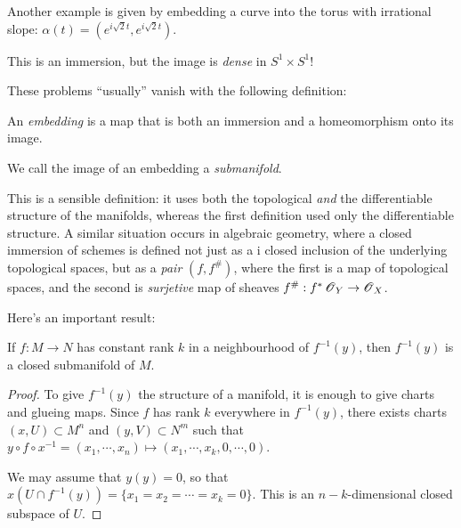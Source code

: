 \documentclass[11pt, english]{article}
\begin{document}
\begin{example}
Another example is given by embedding a curve into the torus with irrational slope: $\alpha(t)=\left( e^{i\sqrt{2}t},e^{i\sqrt{2}t}\right)$.

This is an immersion, but the image is \emph{dense} in $S^1 \times S^1$!
\end{example}

These problems ``usually'' vanish with the following definition:
\begin{defi}
An \emph{embedding} is a map that is both an immersion and a homeomorphism onto its image.
\end{defi}
We call the image of an embedding a \emph{submanifold}.
\begin{remark}
This is a sensible definition: it uses both the topological \emph{and} the differentiable structure of the manifolds, whereas the first definition used only the differentiable structure. A similar situation occurs in algebraic geometry, where a closed immersion of schemes is defined not just as a i closed inclusion of the underlying topological spaces, but as a \emph{pair} $(f,f^{\#})$, where the first is a map of topological spaces, and the second is \emph{surjetive} map of sheaves $f^{\#}:f^\ast \operatorname{\mathscr{O}}_Y \to \operatorname{\mathscr{O}}_X$.
\end{remark}

Here's an important result:
\begin{prop}
\label{proprank}
If $f:M \to N$ has constant rank $k$ in a neighbourhood of $f^{-1}(y)$, then $f^{-1}(y)$ is a closed submanifold of $M$.
\end{prop}
\begin{proof}
To give $f^{-1}(y)$ the structure of a manifold, it is enough to give charts and glueing maps. Since $f$ has rank $k$ everywhere in $f^{-1}(y)$, there exists charts $(x,U) \subset M^n$ and $(y,V) \subset N^m$ such that $y \circ f \circ x^{-1} = (x_1,\cdots,x_n) \mapsto (x_1,\cdots,x_k,0,\cdots,0)$.

We may assume that $y(y)=0$, so that $x(U \cap f^{-1}(y)) = \{ x_1 = x_2 = \cdots = x_k =0 \}$. This is an $n-k$-dimensional closed subspace of $U$.
\end{proof}
\end{document}
